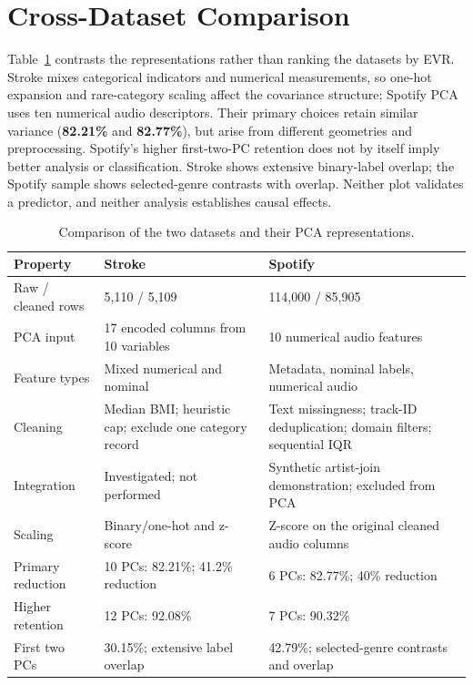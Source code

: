 \documentclass[12pt, a4paper]{article}
\begin{document}
\clearpage
\section{Cross-Dataset Comparison}
Table~\ref{tab:comparison} contrasts the representations rather than ranking the datasets by EVR. Stroke mixes categorical indicators and numerical measurements, so one-hot expansion and rare-category scaling affect the covariance structure; Spotify PCA uses ten numerical audio descriptors. Their primary choices retain similar variance (\textbf{82.21\%} and \textbf{82.77\%}), but arise from different geometries and preprocessing. Spotify's higher first-two-PC retention does not by itself imply better analysis or classification. Stroke shows extensive binary-label overlap; the Spotify sample shows selected-genre contrasts with overlap. Neither plot validates a predictor, and neither analysis establishes causal effects.
\begin{table}[htbp]
\centering\small
\setlength{\tabcolsep}{4pt}\renewcommand{\arraystretch}{1.12}
\caption{Comparison of the two datasets and their PCA representations.}
\label{tab:comparison}
\begin{tabular}{p{.22\linewidth}p{.34\linewidth}p{.34\linewidth}}
\toprule
\raggedright \textbf{Property} & \raggedright \textbf{Stroke} & \raggedright \textbf{Spotify} \tabularnewline
\midrule
\raggedright Raw / cleaned rows & \raggedright 5,110 / 5,109 & \raggedright 114,000 / 85,905 \tabularnewline
\raggedright PCA input & \raggedright 17 encoded columns from 10 variables & \raggedright 10 numerical audio features \tabularnewline
\raggedright Feature types & \raggedright Mixed numerical and nominal & \raggedright Metadata, nominal labels, numerical audio \tabularnewline
\raggedright Cleaning & \raggedright Median BMI; heuristic cap; exclude one category record & \raggedright Text missingness; track-ID deduplication; domain filters; sequential IQR \tabularnewline
\raggedright Integration & \raggedright Investigated; not performed & \raggedright Synthetic artist-join demonstration; excluded from PCA \tabularnewline
\raggedright Scaling & \raggedright Binary/one-hot and z-score & \raggedright Z-score on the original cleaned audio columns \tabularnewline
\raggedright Primary reduction & \raggedright 10 PCs: 82.21\%; 41.2\% reduction & \raggedright 6 PCs: 82.77\%; 40\% reduction \tabularnewline
\raggedright Higher retention & \raggedright 12 PCs: 92.08\% & \raggedright 7 PCs: 90.32\% \tabularnewline
\raggedright First two PCs & \raggedright 30.15\%; extensive label overlap & \raggedright 42.79\%; selected-genre contrasts and overlap \tabularnewline
\bottomrule
\end{tabular}
\end{table}
\end{document}
